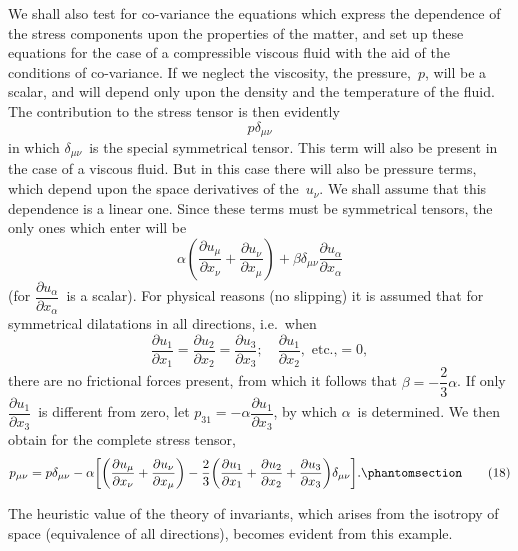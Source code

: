 \documentclass[12pt]{book}[2005/09/16]
\newcommand{\Change}[2]{#2}
\newcommand{\Add}[1]{\Change{}{#1}}
\newcommand{\PageSep}[1]{\ignorespaces}
\newcommand{\Tag}[1]{%
  \phantomsection
  \label{eqn:#1}
  \tag*{#1}
}
\newcommand{\dd}{\partial}
\begin{document}
We shall also test for co-variance the equations which
express the dependence of the stress components upon
the properties of the matter, and set up these equations
for the case of a compressible viscous fluid with the aid
%
%
of the conditions of co-variance. If we neglect the viscosity,
the pressure,~$p$, will be a scalar, and will depend
only upon the density and the temperature of the fluid.
The contribution to the stress tensor is then evidently
%
\[
p \delta_{\mu\nu}
\]
in which $\delta_{\mu\nu}$~is the special symmetrical tensor. This term
will also be present in the case of a viscous fluid. But in
this case there will also be pressure terms, which depend
upon the space derivatives of the~$u_{\nu}$. We shall assume
that this dependence is a linear one. Since these terms
must be symmetrical tensors, the only ones which enter
will be
\[
\alpha\left(\frac{\dd u_{\mu}}{\dd x_{\nu}}
          + \frac{\dd u_{\nu}}{\dd x_{\mu}}\right)
  + \beta\delta_{\mu\nu} \frac{\dd u_{\alpha}}{\dd x_{\alpha}}
\]
(for $\dfrac{\dd u_{\alpha}}{\dd x_{\alpha}}$~is a scalar). For physical reasons (no slipping)
\PageSep{23}
it is assumed that for symmetrical dilatations in all
directions, i.e.~when
\[
\frac{\dd u_{1}}{\dd x_{1}} =
\frac{\dd u_{2}}{\dd x_{2}} =
\frac{\dd u_{3}}{\dd x_{3}};\quad
\frac{\dd u_{1}}{\dd x_{2}}, \text{ etc.,} = 0,
\]
there are no frictional forces present, from which it
follows that $\beta = -\dfrac{2}{3}\alpha$. If only $\dfrac{\dd u_{1}}{\dd x_{\Change{2}{3}}}$~is different from
zero, let $p_{31} = -\Change{\eta}{\alpha} \dfrac{\dd u_{1}}{\dd x_{3}}$, by which $\alpha$~is determined. We
then obtain for the complete stress tensor,
\[
p_{\mu\nu} = p \delta_{\mu\nu} - \Change{\eta}{\alpha} \biggl[
  \biggl(\frac{\dd u_{\mu}}{\dd x_{\nu}}
      + \frac{\dd u_{\nu}}{\dd x_{\mu}}\biggr)
  - \frac{2}{3} \biggl(\frac{\dd u_{1}}{\dd x_{1}}
                    + \frac{\dd u_{2}}{\dd x_{2}}
                    + \frac{\dd u_{3}}{\dd x_{3}}\biggr)\delta_{\mu\nu}
\biggr]\Add{.}
\Tag{(18)}
\]

The heuristic value of the theory of invariants, which
arises from the isotropy of space (equivalence of all
directions), becomes evident from this example.
\end{document}
